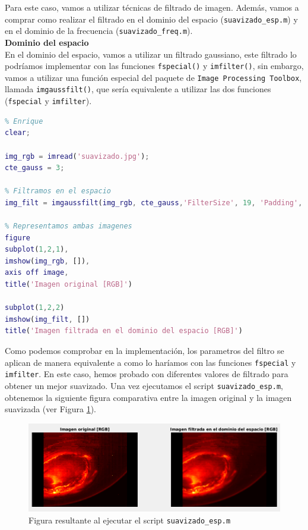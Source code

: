 \documentclass[12pt]{article}
\begin{document}
	\noindent Para este caso, vamos a utilizar técnicas de filtrado de imagen. Además, vamos a comprar como realizar el filtrado en el dominio del espacio (\texttt{suavizado\_esp.m}) y en el dominio de la frecuencia (\texttt{suavizado\_freq.m}). \\
	
	\noindent \textbf{\large Dominio del espacio} \\
	
	\noindent En el dominio del espacio, vamos a utilizar un filtrado gaussiano, este filtrado lo podríamos implementar con las funciones \texttt{fspecial()} y \texttt{imfilter()}, sin embargo, vamos a utilizar una función especial del paquete de \texttt{Image Processing Toolbox}, llamada \texttt{imgaussfilt()}, que sería equivalente a utilizar las dos funciones (\texttt{fspecial} y \texttt{imfilter}).
	
	\begin{lstlisting}[language=Matlab, caption={Implementación de suavizado en el dominio espacial en \texttt{MATLAB}}]
% 4 - Suavizado
% Enrique
clear;

img_rgb = imread('suavizado.jpg');
cte_gauss = 3;

% Filtramos en el espacio
img_filt = imgaussfilt(img_rgb, cte_gauss,'FilterSize', 19, 'Padding', 'circular');

% Representamos ambas imagenes
figure
subplot(1,2,1),
imshow(img_rgb, []),
axis off image,
title('Imagen original [RGB]')

subplot(1,2,2)
imshow(img_filt, [])
title('Imagen filtrada en el dominio del espacio [RGB]')
	\end{lstlisting}

	\vspace{10px}

	\noindent Como podemos comprobar en la implementación, los parametros del filtro se aplican de manera equivalente a como lo haríamos con las funciones \texttt{fspecial} y \texttt{imfilter}. En este caso, hemos probado con diferentes valores de filtrado para obtener un mejor suavizado. Una vez ejecutamos el script \texttt{suavizado\_esp.m}, obtenemos la siguiente figura comparativa entre la imagen original y la imagen suavizada (ver Figura \ref{img: suavizado esp}).
	
	\vspace{10px}
	
	\begin{figure}[h]
		\begin{center}
			\includegraphics[width=1\textwidth]{img/suavizado_esp.png}
			\caption{Figura resultante al ejecutar el script \texttt{suavizado\_esp.m}}
			\label{img: suavizado esp}
		\end{center}
	\end{figure}
\end{document}
